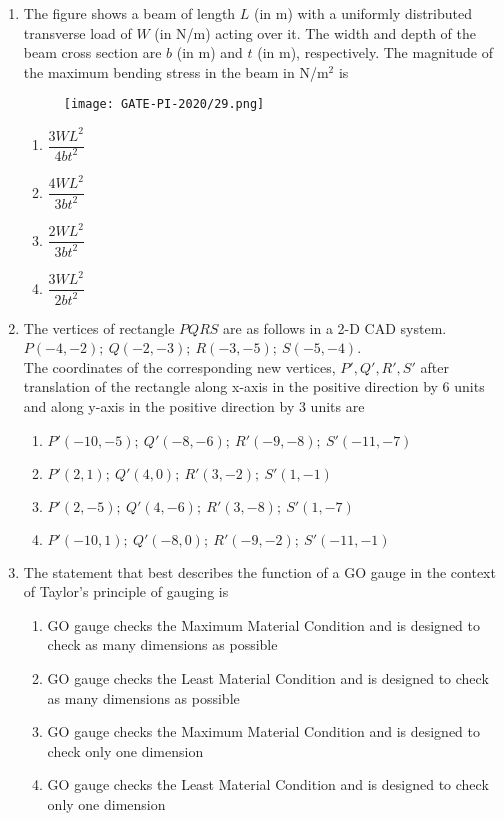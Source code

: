 \documentclass[journal,12pt,onecolumn]{IEEEtran}
\theoremstyle{remark}
\begin{document}
\begin{enumerate}
\item The figure shows a beam of length $L$ (in m) with a uniformly distributed transverse load of $W$ (in N/m) acting over it. The width and depth of the beam cross section are $b$ (in m) and $t$ (in m), respectively. The magnitude of the maximum bending stress in the beam in N/m$^2$ is
\begin{figure}[H]
    \centering
    \texttt{[image: GATE-PI-2020/29.png]} 
    \caption{}
    \label{29}
\end{figure}
\begin{enumerate}
    \item $\dfrac{3 W L^2}{4 b t^2}$
    \item $\dfrac{4 W L^2}{3 b t^2}$
    \item $\dfrac{2 W L^2}{3 b t^2}$
    \item $\dfrac{3 W L^2}{2 b t^2}$
\end{enumerate}
\vspace{1cm}

\item The vertices of rectangle $PQRS$ are as follows in a 2-D CAD system.\\
$P(-4,-2);~Q(-2,-3);~R(-3,-5);~S(-5,-4)$.\\
The coordinates of the corresponding new vertices, $P', Q', R', S'$ after translation of the rectangle along x-axis in the positive direction by 6 units and along y-axis in the positive direction by 3 units are
\begin{multicols}{2}
\begin{enumerate}
    \item $P'(-10,-5);~Q'(-8,-6);~R'(-9,-8);~S'(-11,-7)$
    \item $P'(2,1);~Q'(4,0);~R'(3,-2);~S'(1,-1)$
    \item $P'(2,-5);~Q'(4,-6);~R'(3,-8);~S'(1,-7)$
    \item $P'(-10,1);~Q'(-8,0);~R'(-9,-2);~S'(-11,-1)$
\end{enumerate}
\end{multicols}
\vspace{1cm}

\item The statement that best describes the function of a GO gauge in the context of Taylor's principle of gauging is
\begin{enumerate}
    \item GO gauge checks the Maximum Material Condition and is designed to check as many dimensions as possible
    \item GO gauge checks the Least Material Condition and is designed to check as many dimensions as possible
    \item GO gauge checks the Maximum Material Condition and is designed to check only one dimension
    \item GO gauge checks the Least Material Condition and is designed to check only one dimension
\end{enumerate}
\vspace{1cm}


\end{enumerate}
\end{document}
